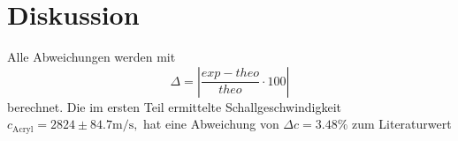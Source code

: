 \section{Diskussion}
\label{sec:Diskussion}

Alle Abweichungen werden mit 
\begin{equation*}
    \Delta = |\frac{exp - theo}{theo} \cdot 100|
\end{equation*}
berechnet.
Die im ersten Teil ermittelte Schallgeschwindigkeit $c_{\text{Acryl}} = 2824 ± 84.7 \si{\meter\per\second},$
hat eine Abweichung von $Δc = 3.48\%$ zum Literaturwert \cite{Schallgeschwindigkeit von Acryl}
